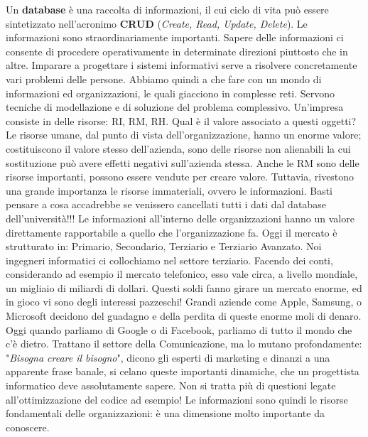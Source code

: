 Un \textbf{database} è una raccolta di informazioni, il cui ciclo di vita può essere sintetizzato nell’acronimo \textbf{CRUD} (\textit{Create, Read, Update, Delete}). Le informazioni sono straordinariamente importanti. Sapere delle informazioni ci consente di procedere operativamente in determinate direzioni piuttosto che in altre. Imparare a progettare i sistemi informativi serve a risolvere concretamente vari problemi delle persone. Abbiamo quindi a che fare con un mondo di informazioni ed organizzazioni, le quali giacciono in complesse reti. Servono tecniche di modellazione e di soluzione del problema complessivo.  
Un'impresa consiste in delle risorse: RI, RM, RH. Qual è il valore associato a questi oggetti? Le risorse umane, dal punto di vista dell'organizzazione, hanno un enorme valore; costituiscono il valore stesso dell'azienda, sono delle risorse non alienabili la cui sostituzione può avere effetti negativi sull’azienda stessa. Anche le RM sono delle risorse importanti, possono essere vendute per creare valore. Tuttavia, rivestono una grande importanza le risorse immateriali, ovvero le informazioni. Basti pensare a cosa accadrebbe se venissero cancellati tutti i dati dal database dell'università!!! Le informazioni all'interno delle organizzazioni hanno un valore direttamente rapportabile a quello che l'organizzazione fa. Oggi il mercato è strutturato in: Primario, Secondario, Terziario e Terziario Avanzato. Noi ingegneri informatici ci collochiamo nel settore terziario. Facendo dei conti, considerando ad esempio il mercato telefonico, esso vale circa, a livello mondiale, un migliaio di miliardi di dollari. Questi soldi fanno girare un mercato enorme, ed in gioco vi sono degli interessi pazzeschi! Grandi aziende come Apple, Samsung, o Microsoft decidono del guadagno e della perdita di queste enorme moli di denaro. Oggi quando parliamo di Google o di Facebook, parliamo di tutto il mondo che c'è dietro. Trattano il settore della Comunicazione, ma lo mutano profondamente: "\textit{Bisogna creare il bisogno}", dicono gli esperti di marketing e dinanzi a una apparente frase banale, si celano queste importanti dinamiche, che un progettista informatico deve assolutamente sapere. Non si tratta più di questioni legate all'ottimizzazione del codice ad esempio! Le informazioni sono quindi le risorse fondamentali delle organizzazioni: è una dimensione molto importante da conoscere.  
 
